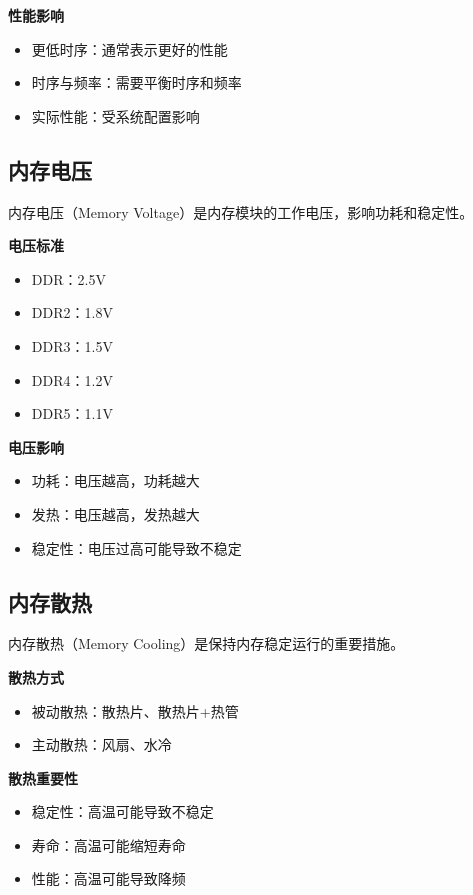 \documentclass{article}
\begin{document}
\textbf{性能影响}
\begin{itemize}
    \item 更低时序：通常表示更好的性能
    \item 时序与频率：需要平衡时序和频率
    \item 实际性能：受系统配置影响
\end{itemize}

\subsection{内存电压}

内存电压（Memory Voltage）是内存模块的工作电压，影响功耗和稳定性。

\textbf{电压标准}
\begin{itemize}
    \item DDR：2.5V
    \item DDR2：1.8V
    \item DDR3：1.5V
    \item DDR4：1.2V
    \item DDR5：1.1V
\end{itemize}

\textbf{电压影响}
\begin{itemize}
    \item 功耗：电压越高，功耗越大
    \item 发热：电压越高，发热越大
    \item 稳定性：电压过高可能导致不稳定
\end{itemize}

\subsection{内存散热}

内存散热（Memory Cooling）是保持内存稳定运行的重要措施。

\textbf{散热方式}
\begin{itemize}
    \item 被动散热：散热片、散热片+热管
    \item 主动散热：风扇、水冷
\end{itemize}

\textbf{散热重要性}
\begin{itemize}
    \item 稳定性：高温可能导致不稳定
    \item 寿命：高温可能缩短寿命
    \item 性能：高温可能导致降频
\end{itemize}
\end{document}
